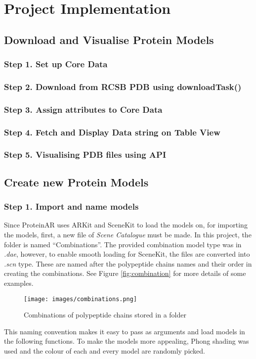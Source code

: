 \chapter{Project Implementation}
\label{ch:implementation}

\section{Download and Visualise Protein Models}
\subsection{Step 1. Set up Core Data}
\subsection{Step 2. Download from RCSB PDB using downloadTask()}
\subsection{Step 3. Assign attributes to Core Data}
\subsection{Step 4. Fetch and Display Data string on Table View}
\subsection{Step 5. Visualising PDB files using API}


\section{Create new Protein Models}
\subsection{Step 1. Import and name models}
Since ProteinAR uses ARKit and SceneKit to load the models on, for importing the models, first, a new file of \emph{Scene Catalogue} must be made. In this project, the folder is named “Combinations”. The provided combination model type was in \emph{.dae}, however, to enable smooth loading for SceneKit, the files are converted into \emph{.scn} type. These are named after the polypeptide chains names and their order in creating the combinations. See Figure \ref{fig:combination} for more details of some examples.
 \begin{figure}[!htp]
	\centering
	\texttt{[image: images/combinations.png]}
	\caption{Combinations of polypeptide chains stored in a folder}
	\label{fig:combinations}
\end{figure}
This naming convention makes it easy to pass as arguments and load models in the following functions. To make the models more appealing, Phong shading was used and the colour of each and every model are randomly picked. 

